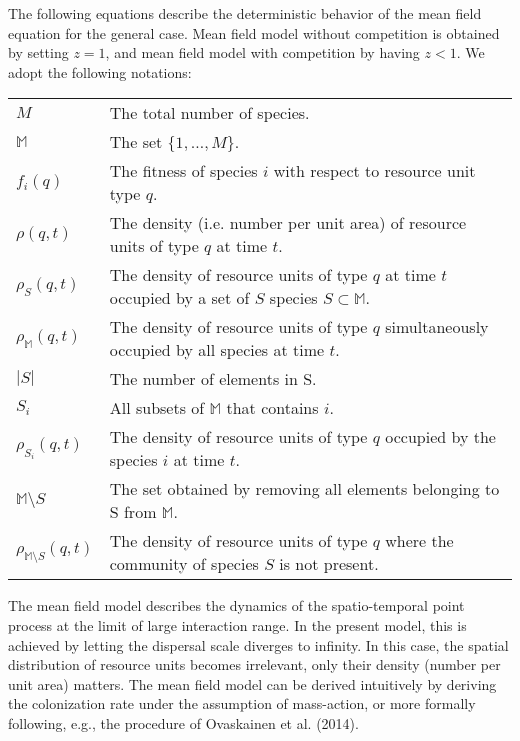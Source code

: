 \documentclass[8pt,a4paper]{article}
\begin{document}
The following equations describe the deterministic behavior of the mean field equation for the general case. Mean field model without competition is obtained by setting $z=1$, and mean field model with competition  by having $z<1$. We adopt  the following notations:

\begin{tabular}{ll}
$M$ & The total number of species. \\
$\mathbb{M}$ & The set $\{1,\ldots, M\}.$\\
$f_i (q)$ & The fitness of species $i$ with respect to resource unit type $q$. \\
$\rho(q,t)$ & The density (i.e. number per unit area) of resource units of type   $q$ at time $t$. \\
$\rho_S (q,t)$ & The density of resource units of type $q$ at time $t$ occupied by a set of  $ S$ species $S \subset \mathbb{M}$.\\
$\rho_{\mathbb{M}}(q,t)$ & The density of resource units of type $q$ simultaneously occupied by all species at time $t.$ \\
$|S|$ & The number of elements in S. \\
$S_i$ & All subsets of $\mathbb{M}$ that contains $i.$\\
$\rho_{S_i}(q,t)$ & The density of resource units of type $q$ occupied by the species $i$ at time $t.$ \\
$\mathbb{M}\setminus{S}$ & The set obtained by removing all elements belonging to S from $\mathbb{M}.$\\
$\rho_{\mathbb{M}\setminus{S}}(q,t)$ & The density of resource units of type $q$ where the community of species $S$ is not present. 
\end{tabular}
\vspace{0.6 cm}

The mean field model describes the dynamics of the spatio-temporal point process at the limit of large interaction range. In the present model, this is achieved by letting the dispersal scale diverges to infinity. In this case, the spatial distribution of resource units becomes irrelevant, only their density (number per unit area) matters. The mean field model can be derived intuitively by deriving the colonization rate under the assumption of mass-action, or more formally following, e.g., the procedure of Ovaskainen et al. (2014).
\end{document}
